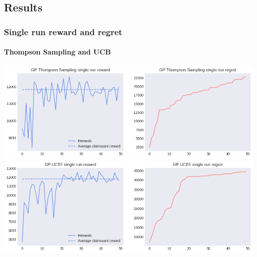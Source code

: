 
\subsection{Results}


\begin{frame}[plain]

\frametitle{Single run reward and regret}
\framesubtitle{Thompson Sampling and UCB}

\begin{center}
	\includegraphics[scale=0.4]{img/Graphs/uncertain_alpha/image1.png}
	\includegraphics[scale=0.4]{img/Graphs/uncertain_alpha/image2.png}
\end{center}

\end{frame}


